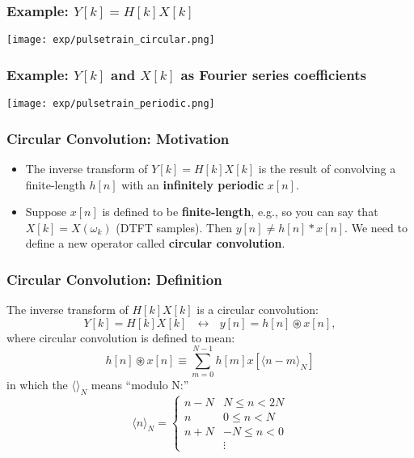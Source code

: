 \documentclass{beamer}
\begin{document}
\begin{frame}
  \frametitle{Example: $Y[k]=H[k]X[k]$}

  \centerline{\texttt{[image: exp/pulsetrain\_circular.png]}}
\end{frame}

\begin{frame}
  \frametitle{Example: $Y[k]$ and $X[k]$ as Fourier series coefficients}

  \centerline{\texttt{[image: exp/pulsetrain\_periodic.png]}}
\end{frame}

\begin{frame}
  \frametitle{Circular Convolution: Motivation}

  \begin{itemize}
  \item The inverse transform of $Y[k]=H[k]X[k]$ is the result of convolving
    a finite-length $h[n]$ with an {\bf infinitely periodic} $x[n]$.
  \item Suppose $x[n]$ is defined to be {\bf finite-length}, e.g., so
    you can say that $X[k]=X(\omega_k)$ (DTFT samples).  Then $y[n]\ne
    h[n]\ast x[n]$.  We need to define a new operator called {\bf
      circular convolution}.
  \end{itemize}
\end{frame}

\begin{frame}
  \frametitle{Circular Convolution: Definition}

  The inverse transform of $H[k]X[k]$ is a circular convolution:
  \begin{displaymath}
    Y[k]=H[k]X[k]~~~\leftrightarrow~~~y[n]=h[n]\circledast x[n],
  \end{displaymath}
  where circular convolution is defined to mean:
  \begin{displaymath}
    h[n]\circledast x[n] \equiv \sum_{m=0}^{N-1} h\left[m\right]x\left[\langle n-m\rangle_N\right]
  \end{displaymath}
  in which the $\langle\rangle_N$ means ``modulo N:''
  \begin{displaymath}
    \langle n\rangle_N =\begin{cases}
    n-N & N\le n<2N\\
    n & 0\le n<N\\
    n+N & -N\le n<0\\
    & \vdots
    \end{cases}
  \end{displaymath}
\end{frame}
\end{document}
